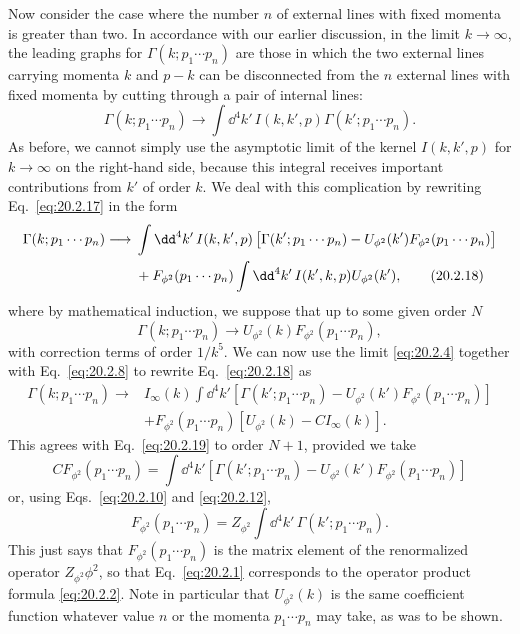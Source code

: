 Now consider the case where the number $n$ of external lines with fixed
momenta is greater than two. In accordance with our earlier discussion, in
the limit $k\to\infty$, the leading graphs for
$\Gamma(k;p_1\cdots p_n)$ are those in which the two external lines carrying
momenta $k$ and $p-k$ can be disconnected from the $n$ external lines with
fixed momenta by cutting through a pair of internal lines:
\begin{equation}
 \Gamma(k;p_1\cdots p_n)\longrightarrow
 \int \dd^4k'\,I(k,k',p)\Gamma(k';p_1\cdots p_n).
 \tag{20.2.17}\label{eq:20.2.17}
\end{equation}
As before, we cannot simply use the asymptotic limit of the kernel
$I(k,k',p)$ for $k\to\infty$ on the right-hand side, because this integral
receives important contributions from $k'$ of order $k$. We deal with this
complication by rewriting Eq.~\eqref{eq:20.2.17} in the form
\begin{align}
 \Gamma(k;p_1\cdots p_n)\longrightarrow{}&
 \int \dd^4k'\,I(k,k',p)
 \left[\Gamma(k';p_1\cdots p_n)
 -U_{\phi^2}(k')F_{\phi^2}(p_1\cdots p_n)\right]
 \notag\\
 &+F_{\phi^2}(p_1\cdots p_n)
 \int \dd^4k'\,I(k',k,p)U_{\phi^2}(k'),
 \tag{20.2.18}\label{eq:20.2.18}
\end{align}
where by mathematical induction, we suppose that up to some given order $N$
\begin{equation}
 \Gamma(k;p_1\cdots p_n)\longrightarrow
 U_{\phi^2}(k)F_{\phi^2}(p_1\cdots p_n),
 \tag{20.2.19}\label{eq:20.2.19}
\end{equation}
with correction terms of order $1/k^5$. We can now use the limit
\eqref{eq:20.2.4} together with Eq.~\eqref{eq:20.2.8} to rewrite
Eq.~\eqref{eq:20.2.18} as
\begin{align*}
 \Gamma(k;p_1\cdots p_n)\longrightarrow{}&
 I_\infty(k)\int \dd^4k'
 \left[\Gamma(k';p_1\cdots p_n)
 -U_{\phi^2}(k')F_{\phi^2}(p_1\cdots p_n)\right]
 \\
 &+F_{\phi^2}(p_1\cdots p_n)
 \left[U_{\phi^2}(k)-CI_\infty(k)\right].
\end{align*}
This agrees with Eq.~\eqref{eq:20.2.19} to order $N+1$, provided we take
\[
 CF_{\phi^2}(p_1\cdots p_n)=\int \dd^4k'
 \left[\Gamma(k';p_1\cdots p_n)
 -U_{\phi^2}(k')F_{\phi^2}(p_1\cdots p_n)\right]
\]
or, using Eqs.~\eqref{eq:20.2.10} and \eqref{eq:20.2.12},
\begin{equation}
 F_{\phi^2}(p_1\cdots p_n)=
 Z_{\phi^2}\int \dd^4k'\,\Gamma(k';p_1\cdots p_n).
 \tag{20.2.20}\label{eq:20.2.20}
\end{equation}
This just says that $F_{\phi^2}(p_1\cdots p_n)$ is the matrix element of the
renormalized operator $Z_{\phi^2}\phi^2$, so that Eq.~\eqref{eq:20.2.1}
corresponds to the operator product formula \eqref{eq:20.2.2}. Note in
particular that $U_{\phi^2}(k)$ is the same coefficient function whatever
value $n$ or the momenta $p_1\cdots p_n$ may take, as was to be shown.

